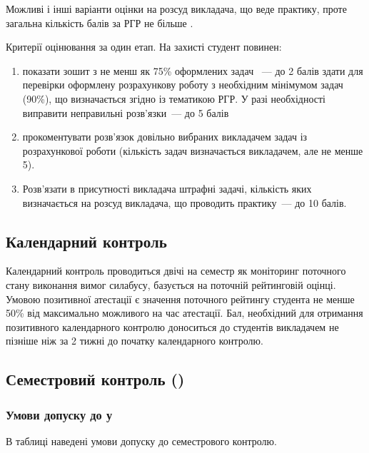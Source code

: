 \documentclass{Syllabus}
\begin{document}
Можливі і інші варіанти оцінки на розсуд викладача, що веде практику, проте загальна кількість балів за РГР не більше \rgrBal.

Критерії оцінювання за один етап. На захисті студент повинен:
\begin{enumerate}[label=$\bullet$]
	\item показати зошит з не менш як 75\% оформлених задач~ --- до 2 балів
	      здати для перевірки оформлену розрахункову роботу з необхідним мінімумом задач (90\%), що визначається згідно із тематикою РГР. У разі необхідності виправити неправильні розв’язки~--- до 5 балів
	\item прокоментувати розв’язок довільно вибраних викладачем задач із розрахункової роботи (кількість задач визначається викладачем, але не менше 5).
	\item  Розв’язати в присутності викладача штрафні задачі, кількість яких визначається на розсуд викладача, що проводить практику~--- до 10 балів.
\end{enumerate}


\subsection*{Календарний контроль}

Календарний контроль проводиться двічі на семестр як моніторинг поточного стану виконання вимог силабусу,  базується на поточній рейтинговій оцінці. Умовою позитивної атестації є значення поточного рейтингу студента не менше 50\% від максимально можливого на час атестації. Бал, необхідний для отримання позитивного календарного контролю доноситься до студентів викладачем не пізніше ніж за 2 тижні до початку календарного контролю.

\subsection*{Семестровий контроль (\control)}

\pgfmathsetmacro{\kontrolBal}{\kontrolBalp + \kontrolBalu}

\subsubsection*{Умови допуску до \control у}

В таблиці наведені умови допуску до семестрового контролю.
\end{document}
